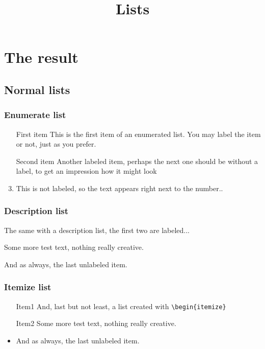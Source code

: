 \documentclass{generic}
\begin{document}
\title{Lists}

\tableofcontents



\section{The result}

\subsection{Normal lists}

\subsubsection{Enumerate list}
\begin{enumerate}
\item[First item]
  This is the first item of an enumerated list. 
  You may label the item or not, just as you prefer.
\item[Second item]
  Another labeled item, perhaps the next one should 
  be without a label, to get an impression
  how it might look
\item
  This is not labeled, so the text appears right 
  next to the number..
\end{enumerate} 

\subsubsection{Description list}
\begin{description}
\item[Item1]
  The same with a description list, 
  the first two are labeled...
\item[Item2]
  Some more test text, nothing really creative.
\item
  And as always, the last unlabeled item.
\end{description}

\subsubsection{Itemize list}
\begin{itemize}
\item[Item1]
  And, last but not least, a list created with \verb/\begin{itemize}/
\item[Item2]
  Some more test text, nothing really creative.
\item
  And as always, the last unlabeled item.
\end{itemize}
\end{document}
